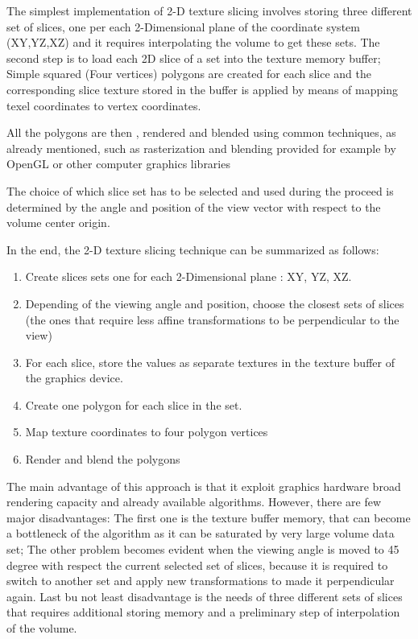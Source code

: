 \documentclass[10pt,a4paper]{article}
\begin{document}
The simplest implementation of 2-D texture slicing involves storing three different set of slices, one per each 2-Dimensional plane of the coordinate system (XY,YZ,XZ) and it requires interpolating the volume to get these sets.
The second step is to load each 2D slice of a set into the texture memory buffer;  Simple squared (Four vertices) polygons are created for each slice and the corresponding slice texture stored in the buffer is applied by means of mapping
texel coordinates to vertex coordinates.

All the polygons are then , rendered and blended using common techniques, as already mentioned, such as rasterization and blending provided for example by OpenGL or other computer graphics libraries

The choice of which slice set has to be selected and used during the proceed is determined by the angle and position of the view vector with respect to the volume center origin.

In the end, the 2-D texture slicing technique can be summarized as follows:
\begin{enumerate}
\item Create slices sets one for each 2-Dimensional plane : XY, YZ, XZ.
\item Depending of the viewing angle and position, choose the closest sets of slices (the ones that require less affine transformations to be perpendicular to the view)
\item For each slice, store the values as separate textures in the texture buffer of the graphics device.
\item Create one polygon for each slice in the set.
\item Map texture coordinates to four polygon vertices
\item Render and blend the polygons
\end{enumerate}

The main advantage of this approach is that it exploit graphics hardware broad rendering capacity and already available algorithms. However, there are few major disadvantages: The first one is the texture buffer memory, that can become a bottleneck of the algorithm as it can be saturated by very large volume data set; The other problem becomes evident when the viewing angle is moved to 45 degree with respect the current selected set of slices, because it is required to switch to another set and apply new transformations to made it perpendicular again.
Last bu not least disadvantage is the needs of three different sets of slices that requires additional storing memory and a preliminary step of interpolation of the volume.
\end{document}
